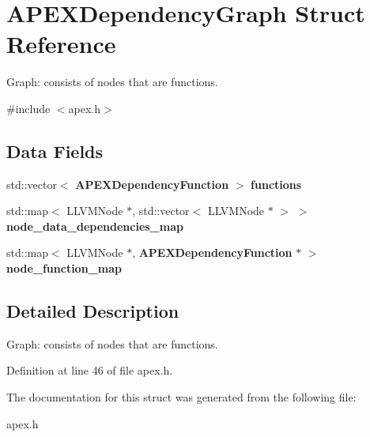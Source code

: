 \section{A\+P\+E\+X\+Dependency\+Graph Struct Reference}
\label{structAPEXDependencyGraph}


Graph\+: consists of nodes that are functions.  




{\ttfamily \#include $<$apex.\+h$>$}

\subsection*{Data Fields}
\begin{DoxyCompactItemize}
\item 
\mbox{\label{structAPEXDependencyGraph_ab358b0afe44dc73e8db4c53689de6aa8}} 
std\+::vector$<$ \textbf{ A\+P\+E\+X\+Dependency\+Function} $>$ {\bfseries functions}
\item 
\mbox{\label{structAPEXDependencyGraph_af6237ef27a89f712d5fe205f9052c31f}} 
std\+::map$<$ L\+L\+V\+M\+Node $\ast$, std\+::vector$<$ L\+L\+V\+M\+Node $\ast$ $>$ $>$ {\bfseries node\+\_\+data\+\_\+dependencies\+\_\+map}
\item 
\mbox{\label{structAPEXDependencyGraph_a582babaf3ee3b4c17c347d1c2917515d}} 
std\+::map$<$ L\+L\+V\+M\+Node $\ast$, \textbf{ A\+P\+E\+X\+Dependency\+Function} $\ast$ $>$ {\bfseries node\+\_\+function\+\_\+map}
\end{DoxyCompactItemize}


\subsection{Detailed Description}
Graph\+: consists of nodes that are functions. 

Definition at line 46 of file apex.\+h.



The documentation for this struct was generated from the following file\+:\begin{DoxyCompactItemize}
\item 
apex.\+h\end{DoxyCompactItemize}
